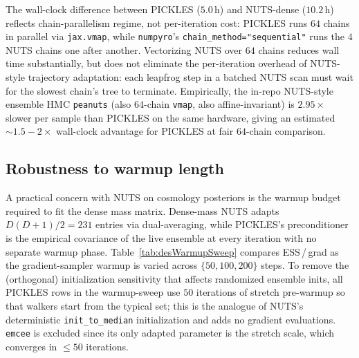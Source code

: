 \documentclass{article}
\begin{document}
The wall-clock difference between PICKLES ($5.0$\,h) and NUTS-dense
($10.2$\,h) reflects chain-parallelism regime, not per-iteration
cost: PICKLES runs $64$ chains in parallel via \texttt{jax.vmap}, while
\texttt{numpyro}'s \texttt{chain\_method="sequential"} runs the $4$
NUTS chains one after another. Vectorizing NUTS over $64$ chains
reduces wall time substantially, but does not eliminate the per-iteration
overhead of NUTS-style trajectory adaptation: each leapfrog step in
a batched NUTS scan must wait for the slowest chain's tree to terminate.
Empirically, the in-repo NUTS-style ensemble HMC \texttt{peanuts}
(also $64$-chain \texttt{vmap}, also affine-invariant) is
$2.95\!\times$ slower per sample than PICKLES on the same hardware,
giving an estimated $\sim\!1.5\!-\!2\!\times$ wall-clock advantage for
PICKLES at fair $64$-chain comparison.

\subsection{Robustness to warmup length}\label{ssec:desWarmupSweep}

A practical concern with NUTS on cosmology posteriors is the warmup
budget required to fit the dense mass matrix. Dense-mass NUTS adapts
$D(D+1)/2 = 231$ entries via dual-averaging, while PICKLES's
preconditioner is the empirical covariance of the live ensemble at
every iteration with no separate warmup phase. Table~\ref{tab:desWarmupSweep}
compares ESS\,/\,grad as the gradient-sampler warmup is varied across
$\{50, 100, 200\}$ steps. To remove the (orthogonal) initialization
sensitivity that affects randomized ensemble inits, all PICKLES rows
in the warmup-sweep use $50$ iterations of stretch \cite{goodman2010ensemble}
pre-warmup so that walkers start from the typical set; this is the
analogue of NUTS's deterministic \texttt{init\_to\_median}
initialization and adds no gradient evaluations. \texttt{emcee} is
excluded since its only adapted parameter is the stretch scale, which
converges in $\le 50$ iterations.
\end{document}
